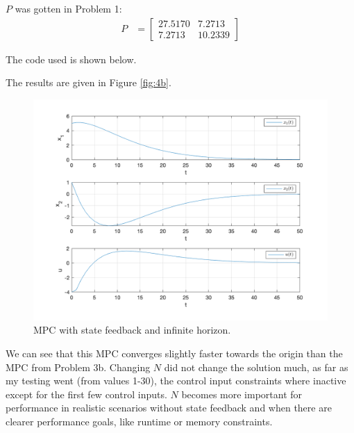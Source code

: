 \documentclass[11pt, a4paper, english]{NTNUoving}
\begin{document}
\begin{oppgave}
    \begin{punkt}

        $P$ was gotten in Problem 1:
        \begin{align*}
            P &= \begin{bmatrix}
                27.5170  &  7.2713 \\
                7.2713  & 10.2339
            \end{bmatrix}
        \end{align*}
    \end{punkt}

    \begin{punkt}
        The code used is shown below.
    

    The results are given in Figure \ref{fig:4b}.
    \begin{figure}[H]
        \centering
        \includegraphics[width=1.0\textwidth]{../task4b.png}
        \caption{MPC with state feedback and infinite horizon.}
        \label{fig:3b}
    \end{figure}
    We can see that this MPC converges slightly faster towards the origin than the MPC from Problem 3b.
    Changing $N$ did not change the solution much, as far as my testing went (from values 1-30), the control input constraints
    where inactive except for the first few control inputs. $N$ becomes more important for performance in realistic scenarios
    without state feedback and when there are clearer performance goals, like runtime or memory constraints.
    \end{punkt}
\end{oppgave}
\end{document}
